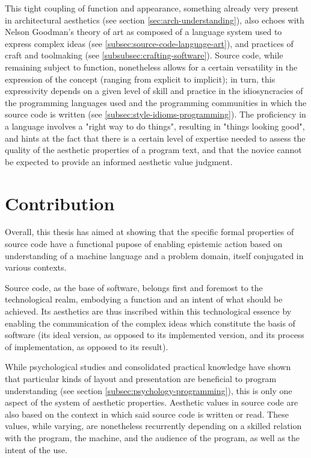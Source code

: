 This tight coupling of function and appearance, something already very present in architectural aesthetics (see section \ref{sec:arch-understanding}), also echoes with Nelson Goodman's theory of art as composed of a language system used to express complex ideas (see \ref{subsec:source-code-language-art}), and practices of craft and toolmaking (see \ref{subsubsec:crafting-software}). Source code, while remaining subject to function, nonetheless allows for a certain versatility in the expression of the concept (ranging from explicit to implicit); in turn, this expressivity depends on a given level of skill and practice in the idiosyncracies of the programming languages used and the programming communities in which the source code is written (see \ref{subsec:style-idioms-programming}). The proficiency in a language involves a "right way to do things", resulting in "things looking good", and hints at the fact that there is a certain level of expertise needed to assess the quality of the aesthetic properties of a program text, and that the novice cannot be expected to provide an informed aesthetic value judgment.

\section{Contribution}
\label{sec:conclusion-contribution}

Overall, this thesis has aimed at showing that the specific formal properties of source code have a functional pupose of enabling epistemic action based on understanding of a machine language and a problem domain, itself conjugated in various contexts.

Source code, as the base of software, belongs first and foremost to the technological realm, embodying a function and an intent of what should be achieved. Its aesthetics are thus inscribed within this technological essence by enabling the communication of the complex ideas which constitute the basis of software (its ideal version, as opposed to its implemented version, and its process of implementation, as opposed to its result).

While psychological studies and consolidated practical knowledge have shown that particular kinds of layout and presentation are beneficial to program understanding (see section \ref{subsec:psychology-programming}), this is only one aspect of the system of aesthetic properties. Aesthetic values in source code are also based on the context in which said source code is written or read. These values, while varying, are nonetheless recurrently depending on a skilled relation with the program, the machine, and the audience of the program, as well as the intent of the use.

